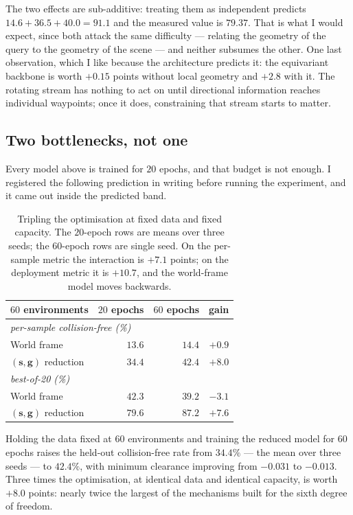 \documentclass[11pt,a4paper]{article}
\newcommand{\toprule}{\hline}
\newcommand{\midrule}{\hline}
\newcommand{\bottomrule}{\hline}
\newcommand{\svec}{\mathbf{s}}
\newcommand{\gvec}{\mathbf{g}}
\begin{document}
The two effects are sub-additive: treating them as independent predicts
$14.6+36.5+40.0=91.1$ and the measured value is $79.37$. That is what I would
expect, since both attack the same difficulty --- relating the geometry of the
query to the geometry of the scene --- and neither subsumes the other. One last
observation, which I like because the architecture predicts it: the equivariant
backbone is worth $+0.15$ points without local geometry and $+2.8$ with it. The
rotating stream has nothing to act on until directional information reaches
individual waypoints; once it does, constraining that stream starts to matter.

\subsection{Two bottlenecks, not one}
\label{sec:budget}

Every model above is trained for $20$ epochs, and that budget is not enough. I
registered the following prediction in writing before running the experiment, and
it came out inside the predicted band.

\begin{table}[t]
\centering
\begin{tabular}{lrrr}
\toprule
$60$ environments & $20$ epochs & $60$ epochs & gain \\
\midrule
\multicolumn{4}{l}{\emph{per-sample collision-free (\%)}}\\
World frame               & $13.6$ & $14.4$ & $+0.9$ \\
$(\svec,\gvec)$ reduction & $34.4$ & $\mathbf{42.4}$ & $+8.0$ \\[3pt]
\multicolumn{4}{l}{\emph{best-of-20 (\%)}}\\
World frame               & $42.3$ & $39.2$ & $-3.1$ \\
$(\svec,\gvec)$ reduction & $79.6$ & $\mathbf{87.2}$ & $+7.6$ \\
\bottomrule
\end{tabular}
\caption{Tripling the optimisation at fixed data and fixed capacity. The
$20$-epoch rows are means over three seeds; the $60$-epoch rows are single seed.
On the per-sample metric the interaction is $+7.1$ points; on the deployment
metric it is $+10.7$, and the world-frame model moves backwards.}
\label{tab:budget}
\end{table}

Holding the data fixed at $60$ environments and training the reduced model for $60$
epochs raises the held-out collision-free rate from $34.4\%$ --- the mean over
three seeds --- to $\mathbf{42.4\%}$, with minimum clearance improving from
$-0.031$ to $-0.013$. Three times the optimisation, at identical data and
identical capacity, is worth $+8.0$ points: nearly twice the largest of the
mechanisms built for the sixth degree of freedom.
\end{document}
